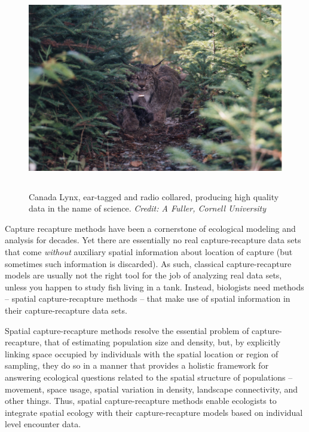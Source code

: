 \begin{figure}[h!]
\centering
\includegraphics[height=3.5in]{Ch20-Last/lynx.jpg}
\caption{
Canada Lynx, ear-tagged and radio collared, producing high quality
data in the name of science.
{\it Credit: A Fuller, Cornell University}  }
\label{fig.lynx}
\end{figure}


Capture recapture methods have been a cornerstone of ecological
modeling and analysis for decades.  Yet there are essentially no real
capture-recapture data sets that come {\it without} auxiliary spatial
information about location of capture (but sometimes such information
is discarded).  As such, classical capture-recapture
models are usually not the right tool for the job of analyzing real
data sets, unless you happen to study fish living in a tank.
Instead, biologists need methods -- spatial
capture-recapture methods -- that make use of spatial
information in their capture-recapture data sets.


Spatial capture-recapture methods resolve the essential problem of
capture-recapture, that of estimating population size and density,
but, by explicitly linking space occupied by individuals with the
spatial location or region of sampling, they do so in a manner that
provides a holistic framework for answering ecological questions
related to the spatial structure of populations -- movement, space
usage, spatial variation in density, landscape connectivity, and other
things.  Thus, spatial capture-recapture methods enable ecologists to
integrate spatial ecology
with their capture-recapture models based on
individual level encounter data.

